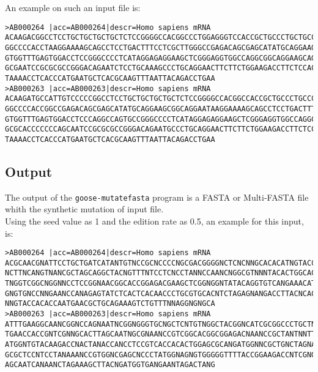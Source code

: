An example on such an input file is:
\begin{lstlisting}
>AB000264 |acc=AB000264|descr=Homo sapiens mRNA 
ACAAGACGGCCTCCTGCTGCTGCTGCTCTCCGGGGCCACGGCCCTGGAGGGTCCACCGCTGCCCTGCTGCCATTGTCCCC
GGCCCCACCTAAGGAAAAGCAGCCTCCTGACTTTCCTCGCTTGGGCCGAGACAGCGAGCATATGCAGGAAGCGGCAGGAA
GTGGTTTGAGTGGACCTCCGGGCCCCTCATAGGAGAGGAAGCTCGGGAGGTGGCCAGGCGGCAGGAAGCAGGCCAGTGCC
GCGAATCCGCGCGCCGGGACAGAATCTCCTGCAAAGCCCTGCAGGAACTTCTTCTGGAAGACCTTCTCCACCCCCCCAGC
TAAAACCTCACCCATGAATGCTCACGCAAGTTTAATTACAGACCTGAA
>AB000263 |acc=AB000263|descr=Homo sapiens mRNA 
ACAAGATGCCATTGTCCCCCGGCCTCCTGCTGCTGCTGCTCTCCGGGGCCACGGCCACCGCTGCCCTGCCCCTGGAGGGT
GGCCCCACCGGCCGAGACAGCGAGCATATGCAGGAAGCGGCAGGAATAAGGAAAAGCAGCCTCCTGACTTTCCTCGCTTG
GTGGTTTGAGTGGACCTCCCAGGCCAGTGCCGGGCCCCTCATAGGAGAGGAAGCTCGGGAGGTGGCCAGGCGGCAGGAAG
GCGCACCCCCCCAGCAATCCGCGCGCCGGGACAGAATGCCCTGCAGGAACTTCTTCTGGAAGACCTTCTCCTCCTGCAAA
TAAAACCTCACCCATGAATGCTCACGCAAGTTTAATTACAGACCTGAA
\end{lstlisting}

\subsection*{Output}
The output of the \texttt{goose-mutatefasta} program is a FASTA or Multi-FASTA file whith the synthetic mutation of input file.\\
Using the seed value as 1 and the edition rate as 0.5, an example for this input, is: 
\begin{lstlisting}
>AB000264 |acc=AB000264|descr=Homo sapiens mRNA 
ACGCAACGNATTCCTGCTGATCATANTGTNCCGCNCCCCNGCGACGGGGNCTCNCNNGCACACATNGTACCATTGTCCAC
NCTTNCANGTNANCGCTAGCAGGCTACNGTTTNTCCTCNCCTANNCCAANCNGGCGTNNNTACACTGGCACGTGCAGGCA
TNGGTCGGCNGGNNCCTCCGGNAACGGCACCGGAGACGAAGCTCGGNGGNTATACAGGTGTCANGAAACATCCCCGCGNC
GNGTGNCCNNGAANCCANAGAGTATCTCACTCACAACCCTGCGTGCACNTCTAGAGNANGACCTTACNCACCNTCCCNTT
NNGTACCACACCAATGAACGCTGCAGAAAGTCTGTTTNNAGGNGNGCA
>AB000263 |acc=AB000263|descr=Homo sapiens mRNA 
ATTTGAAGGCAANCGGNCCAGNAATNCGGNGGGTGCNGCTCNTGTNGGCTACGGNCATCGCGGCCCTGCTNTANTAAGCN
TGAACCACCGNTCGNNGCACTTAGCAATNGCGNAANCCGTCGGCACGGCGGAGACNAANCCGCTANTNNTTTCCCGCTNA
ATGGNTGTACAAGACCNACTANACCANCCTCCGTCACCACACTGGAGCGCANGATGGNNCGCTGNCTAGNAGNCNNTGAG
GCGCTCCNTCCTANAAANCCGTGGNCGAGCNCCCTATGGNAGNGTGGGGGTTTTACCGGAAGACCNTCGNGCCCTATGGG
AGCAATCANAANCTAGAAAGCTTACNGATGGTGANGAANTAGACTANG
\end{lstlisting}